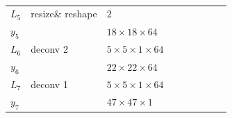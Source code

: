 \begin{table}[h!]
{\begin{tabular}{|lllllllll|}
    \multicolumn{1}{|l|}{$L_5$}   & resize\& reshape & \multicolumn{1}{l|}{$2$}                    &          & \multicolumn{1}{l|}{}        \\
    \multicolumn{1}{|l|}{$y_5$}   &          & \multicolumn{1}{l|}{$18\times18\times 64$}          &          & \multicolumn{1}{l|}{}        \\ \hline

    \multicolumn{1}{|l|}{$L_6$}   & deconv 2   & \multicolumn{1}{l|}{$5\times 5\times1\times 64$}    &          & \multicolumn{1}{l|}{}\\
    \multicolumn{1}{|l|}{$y_6$}   &          & \multicolumn{1}{l|}{$22\times22\times64$}           &          & \multicolumn{1}{l|}{}        \\ \hline


    \multicolumn{1}{|l|}{$L_7$}   & deconv 1   & \multicolumn{1}{l|}{$5\times 5\times1\times 64$}    &          & \multicolumn{1}{l|}{}\\
    \multicolumn{1}{|l|}{$y_7$}   &          & \multicolumn{1}{l|}{$47\times47\times1$}           &          & \multicolumn{1}{l|}{}        \\ \hline
    \end{tabular}
    \caption{} \label{net:2}
    }
    \end{table}

